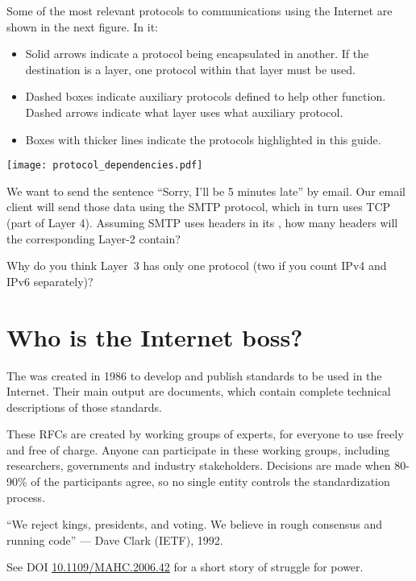 Some of the most relevant protocols to communications using the Internet 
are shown in the next figure. In it:
\begin{itemize}
\item Solid arrows indicate a protocol being encapsulated in another. 
  If the destination is a layer, one protocol within that layer must be used.

\item Dashed boxes indicate auxiliary protocols defined to help other function. 
Dashed arrows indicate what layer uses what auxiliary protocol.

\item Boxes with thicker lines indicate the protocols highlighted in this guide.
\end{itemize}

\texttt{[image: protocol\_dependencies.pdf]}

\begin{exercise}
We want to send the sentence ``Sorry, I'll be 5 minutes late'' by email.
Our email client will send those data using the SMTP protocol, which in turn
uses TCP (part of Layer 4).
% 
Assuming SMTP uses headers in its , how many headers will 
the corresponding Layer-2  contain?
\end{exercise}

\begin{exercise}
Why do you think Layer~3 has only one protocol (two if you count IPv4 and IPv6 separately)? 
\end{exercise}

\section{Who is the Internet boss?}

The  was created in 1986
to develop and publish standards to be used in the Internet. 
% 
Their main output are   documents,
which contain complete technical descriptions of those standards.


These RFCs are created by working groups of experts, 
for everyone to use freely and free of charge. 
% 
Anyone can participate in these working groups, including researchers,
governments and industry stakeholders. 
% 
Decisions are made when 80-90\% of the participants agree, so no single 
entity controls the standardization process.
% 
\begin{remark}
``We reject kings, presidents, and voting. 
We believe in rough consensus and running code'' 
--- Dave Clark (IETF), 1992.

See DOI \href{https://dx.doi.org/10.1109/MAHC.2006.42}{\underline{10.1109/MAHC.2006.42}} for 
a short story of struggle for power.
\end{remark}

